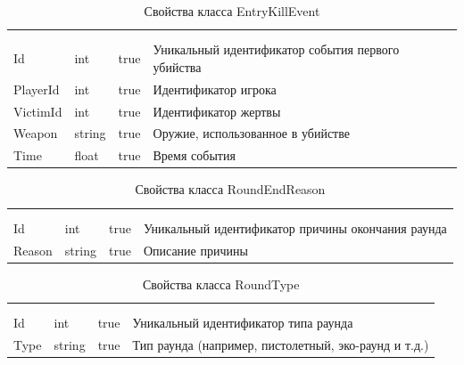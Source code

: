 \begin{xltabular}{\textwidth}{|X|X|X|X|}
	\caption{Свойства класса EntryKillEvent}\label{table:EntryKillEvent}\\ \hline
	 &  &  &  \\ \hline
	 &  &  &  \\ \hline
	\endfirsthead
	 \hline
	 &  &  &  \\ \hline
	\endhead
	Id & int & true & Уникальный идентификатор события первого убийства \\ \hline
	PlayerId & int & true & Идентификатор игрока \\ \hline
	VictimId & int & true & Идентификатор жертвы \\ \hline
	Weapon & string & true & Оружие, использованное в убийстве \\ \hline
	Time & float & true & Время события \\ \hline
\end{xltabular}

\begin{xltabular}{\textwidth}{|X|X|X|X|}
	\caption{Свойства класса RoundEndReason}\label{table:RoundEndReason}\\ \hline
	 &  &  &  \\ \hline
	 &  &  &  \\ \hline
	\endfirsthead
	 \hline
	 &  &  &  \\ \hline
	\endhead
	Id & int & true & Уникальный идентификатор причины окончания раунда \\ \hline
	Reason & string & true & Описание причины \\ \hline
\end{xltabular}

\begin{xltabular}{\textwidth}{|X|X|X|X|}
	\caption{Свойства класса RoundType}\label{table:RoundType}\\ \hline
	 &  &  &  \\ \hline
	 &  &  &  \\ \hline
	\endfirsthead
	 \hline
	 &  &  &  \\ \hline
	\endhead
	Id & int & true & Уникальный идентификатор типа раунда \\ \hline
	Type & string & true & Тип раунда (например, пистолетный, эко-раунд и т.д.) \\ \hline
\end{xltabular}

